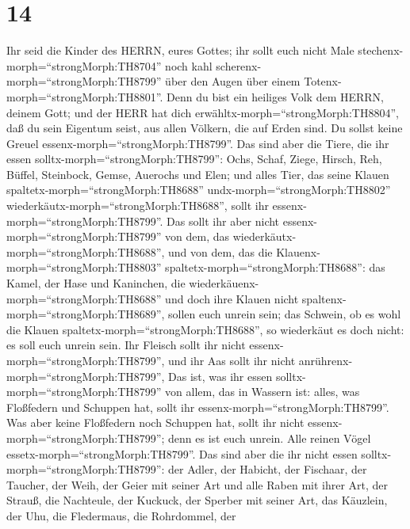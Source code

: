 \hypertarget{section-13}{%
\section{14}\label{section-13}}

 Ihr seid die Kinder des HERRN, eures Gottes; ihr sollt euch
nicht Male stechenx-morph=``strongMorph:TH8704'' noch kahl
scherenx-morph=``strongMorph:TH8799'' über den Augen über einem
Totenx-morph=``strongMorph:TH8801''.  Denn du bist ein
heiliges Volk dem HERRN, deinem Gott; und der HERR hat dich
erwähltx-morph=``strongMorph:TH8804'', daß du sein Eigentum seist, aus
allen Völkern, die auf Erden sind.  Du sollst keine Greuel
essenx-morph=``strongMorph:TH8799''.  Das sind aber die
Tiere, die ihr essen solltx-morph=``strongMorph:TH8799'': Ochs, Schaf,
Ziege,  Hirsch, Reh, Büffel, Steinbock, Gemse, Auerochs und
Elen;  und alles Tier, das seine Klauen
spaltetx-morph=``strongMorph:TH8688'' undx-morph=``strongMorph:TH8802''
wiederkäutx-morph=``strongMorph:TH8688'', sollt ihr
essenx-morph=``strongMorph:TH8799''.  Das sollt ihr aber
nicht essenx-morph=``strongMorph:TH8799'' von dem, das
wiederkäutx-morph=``strongMorph:TH8688'', und von dem, das die
Klauenx-morph=``strongMorph:TH8803''
spaltetx-morph=``strongMorph:TH8688'': das Kamel, der Hase und
Kaninchen, die wiederkäuenx-morph=``strongMorph:TH8688'' und doch ihre
Klauen nicht spaltenx-morph=``strongMorph:TH8689'', sollen euch unrein
sein;  das Schwein, ob es wohl die Klauen
spaltetx-morph=``strongMorph:TH8688'', so wiederkäut es doch nicht: es
soll euch unrein sein. Ihr Fleisch sollt ihr nicht
essenx-morph=``strongMorph:TH8799'', und ihr Aas sollt ihr nicht
anrührenx-morph=``strongMorph:TH8799'',  Das ist, was ihr
essen solltx-morph=``strongMorph:TH8799'' von allem, das in Wassern ist:
alles, was Floßfedern und Schuppen hat, sollt ihr
essenx-morph=``strongMorph:TH8799''.  Was aber keine
Floßfedern noch Schuppen hat, sollt ihr nicht
essenx-morph=``strongMorph:TH8799''; denn es ist euch unrein.
 Alle reinen Vögel essetx-morph=``strongMorph:TH8799''.
 Das sind aber die ihr nicht essen
solltx-morph=``strongMorph:TH8799'': der Adler, der Habicht, der
Fischaar,  der Taucher, der Weih, der Geier mit seiner Art
 und alle Raben mit ihrer Art,  der Strauß,
die Nachteule, der Kuckuck, der Sperber mit seiner Art, 
das Käuzlein, der Uhu, die Fledermaus,  die Rohrdommel, der
